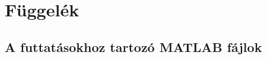 \chapter*{Függelék}\label{fuggelek}

\section*{A futtatásokhoz tartozó MATLAB fájlok}\label{matlabkodok}






